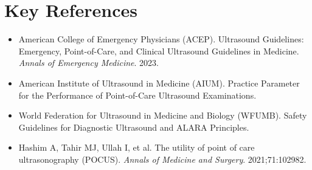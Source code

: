 \section{Key References}

\begin{itemize}
    \item American College of Emergency Physicians (ACEP). Ultrasound Guidelines: Emergency, Point-of-Care, and Clinical Ultrasound Guidelines in Medicine. \textit{Annals of Emergency Medicine}. 2023.
    \item American Institute of Ultrasound in Medicine (AIUM). Practice Parameter for the Performance of Point-of-Care Ultrasound Examinations.
    \item World Federation for Ultrasound in Medicine and Biology (WFUMB). Safety Guidelines for Diagnostic Ultrasound and ALARA Principles.
    \item Hashim A, Tahir MJ, Ullah I, et al. The utility of point of care ultrasonography (POCUS). \textit{Annals of Medicine and Surgery}. 2021;71:102982.
\end{itemize}
